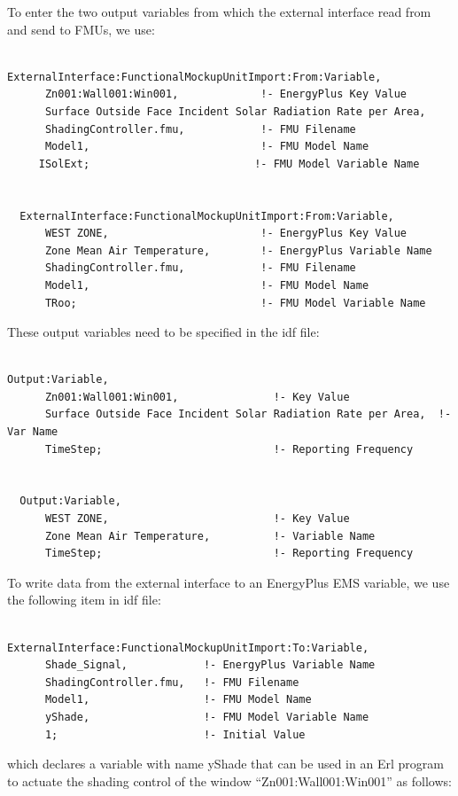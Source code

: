 To enter the two output variables from which the external interface read from and send to FMUs, we use:

\begin{lstlisting}

ExternalInterface:FunctionalMockupUnitImport:From:Variable,
      Zn001:Wall001:Win001,             !- EnergyPlus Key Value
      Surface Outside Face Incident Solar Radiation Rate per Area,
      ShadingController.fmu,            !- FMU Filename
      Model1,                           !- FMU Model Name
     ISolExt;                          !- FMU Model Variable Name


  ExternalInterface:FunctionalMockupUnitImport:From:Variable,
      WEST ZONE,                        !- EnergyPlus Key Value
      Zone Mean Air Temperature,        !- EnergyPlus Variable Name
      ShadingController.fmu,            !- FMU Filename
      Model1,                           !- FMU Model Name
      TRoo;                             !- FMU Model Variable Name
\end{lstlisting}

These output variables need to be specified in the idf file:

\begin{lstlisting}

Output:Variable,
      Zn001:Wall001:Win001,               !- Key Value
      Surface Outside Face Incident Solar Radiation Rate per Area,  !- Var Name
      TimeStep;                           !- Reporting Frequency


  Output:Variable,
      WEST ZONE,                          !- Key Value
      Zone Mean Air Temperature,          !- Variable Name
      TimeStep;                           !- Reporting Frequency
\end{lstlisting}

To write data from the external interface to an EnergyPlus EMS variable, we use the following item in idf file:

\begin{lstlisting}

ExternalInterface:FunctionalMockupUnitImport:To:Variable,
      Shade_Signal,            !- EnergyPlus Variable Name
      ShadingController.fmu,   !- FMU Filename
      Model1,                  !- FMU Model Name
      yShade,                  !- FMU Model Variable Name
      1;                       !- Initial Value
\end{lstlisting}

which declares a variable with name yShade that can be used in an Erl program to actuate the shading control of the window ``Zn001:Wall001:Win001'' as follows:

